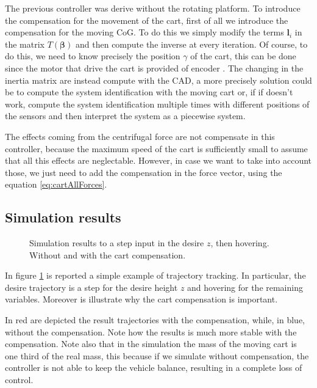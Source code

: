 \noindent The previous controller was derive without the rotating platform. To introduce the compensation for the movement of the cart, first of all we introduce the compensation for the moving CoG. To do this we simply modify the terms $\mathbf{l}_i$ in the matrix $T(\boldsymbol{\beta})$ and then compute the inverse at every iteration. Of course, to do this, we need to know precisely the position $\gamma$ of the cart, this can be done since the motor that drive the cart is provided of encoder \cite{Carlos}. The changing in the inertia matrix are instead compute with the CAD, a more precisely solution could be to compute the system identification with the moving cart or, if if doesn't work, compute the system identification multiple times with different positions of the sensors and then interpret the system as a piecewise system. 

\noindent The effects coming from the centrifugal force are not compensate in this controller, because the maximum speed of the cart is sufficiently small to assume that all this effects are neglectable. However, in case we want to take into account those, we just need to add the compensation in the force vector, using the equation \eqref{eq:cartAllForces}.

\subsection{Simulation results}

\begin{figure}[h!]
	\centering
 	
 	\caption{Simulation results to a step input in the desire $z$, then hovering. Without and with the cart compensation.}
 	\label{fig:simulation1}		
\end{figure}

\noindent In figure \ref{fig:simulation1} is reported a simple example of trajectory tracking. In particular, the desire trajectory is a step for the desire height $z$ and hovering for the remaining variables. Moreover is illustrate why the cart compensation is important. 

\noindent In red are depicted the result trajectories with the compensation, while, in blue, without the compensation. Note how the results is much more stable with the compensation. Note also that in the simulation the mass of the moving cart is one third of the real mass, this because if we simulate without compensation, the controller is not able to keep the vehicle balance, resulting in a complete loss of control. 

